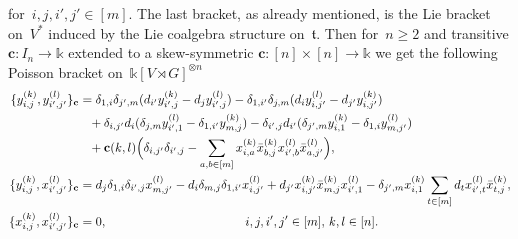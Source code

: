 \documentclass[12pt, reqno]{amsart}
\theoremstyle{definition}
\numberwithin{equation}{section}
\newcommand{\tensor}{\otimes}
\newcommand{\kk}{\mathbb{k}}\newcommand{\lie}[1]{{\mathfrak{#1}}}
\begin{document}
for~$i,j,i',j'\in[m]$. The last bracket, 
as already mentioned, is the Lie bracket on~$V^*$ induced by the Lie coalgebra structure on~$\lie t$.
Then for~$n\ge 2$ and
transitive $\mathbf c:I_n\to \kk$ extended 
to a skew-symmetric $\mathbf c:[n]\times[n]\to\kk$
we get the following Poisson bracket 
on~$\kk[V\rtimes G]^{\tensor n}$
\begin{align}
\{y_{i,j}^{(k)},y_{i',j'}^{(l)}\}_{\mathbf c}&=\delta_{1,i}\delta_{j',m}(d_{i'}y_{i',j}^{(k)}-d_j y^{(l)}_{i',j})
-\delta_{1,i'}\delta_{j,m}(d_i y_{i,j'}^{(l)}-d_{j'}y_{i,j'}^{(k)})\nonumber\\
&\phantom{=}+\delta_{i,j'}d_i(\delta_{j,m}y_{i',1}^{(l)}-
\delta_{1,i'}y_{m,j}^{(k)})
-\delta_{i',j}d_{i'}(\delta_{j',m} y^{(k)}_{i,1}-\delta_{1,i}y^{(l)}_{m,j'})\nonumber\\
&\phantom{=}+\mathbf c(k,l)\Big(\delta_{i,j'}\delta_{i',j}-\sum_{a,b\in[m]}
x_{i,a}^{(k)}\bar x_{b,j}^{(k)}x_{i',b}^{(l)}\bar x_{a,j'}^{(l)}\Big)
,\nonumber\\
\{y_{i,j}^{(k)},x_{i',j'}^{(l)}\}_{\mathbf c}&=
d_j \delta_{1,i}
\delta_{i',j}x^{(l)}_{m,j'}-
d_i \delta_{m,j}\delta_{1,i'}x^{(l)}_{i,j'}+d_{j'} x^{(k)}_{i,j'}\bar x_{m,j}^{(k)}
x^{(l)}_{i',1}-\delta_{j',m}
x_{i,1}^{(k)}\sum_{t\in[m]}d_t x^{(l)}_{i',t}\bar x^{(k)}_{t,j},\nonumber\\
\{x_{i,j}^{(k)},x_{i',j'}^{(l)}\}_{\mathbf c}&=0,\mskip200mu 
i,j,i',j'\in[m],\, k,l\in[n].\label{eq:Poiss Takiff tens}
\end{align}
\end{document}
